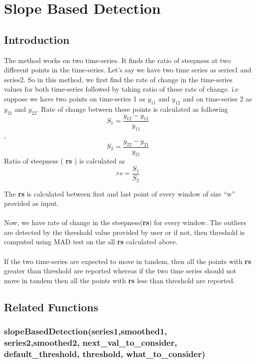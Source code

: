 \chapter{Slope Based Detection}
\label{appendix:slopeBased}
\section{Introduction}

The method works on two time-series. It finds the ratio of steepness 
at two different points in the time-series. Let's say we have two 
time series as series1 and series2. So in this method, we first find 
the rate of change in the time-series values for both time-series followed 
by taking ratio of these rate of change. i.e  suppose we have two points on 
time-series 1 as $y_{11}$ and $y_{12}$ and on time-series 2 as $y_{21}$ and $y_{22}$. 
Rate of change between these points is calculated as following
 $$S_1=\frac{y_{12}-y_{11}}{y_{11}}$$
 ,
  $$S_2=\frac{y_{22}-y_{21}}{y_{21}}$$
 Ratio of steepness ( \textbf{rs} ) is calculated as
 $$rs = \frac{S_1}{S_2}$$

The \textbf{rs} is calculated between first and last point of every window of
size ``w'' provided as input. \\
\\
Now, we have rate of change in the steepness(\textbf{rs}) for every window. 
The outliers are detected by the threshold value provided by user or if not, 
then threshold is computed using MAD test on the all \textbf{rs} calculated above.\\
\\
If the two time-series are expected to move in tandem, then all the points 
with \textbf{rs} greater than threshold are reported whereas if the two time 
series should not move in tandem then all the points with \textbf{rs} less than 
threshold are reported. 

\section{Related Functions}

\subsection{slopeBasedDetection(series1,smoothed1,\\series2,smoothed2, next\_val\_to\_consider,\\ default\_threshold, threshold, what\_to\_consider)}

